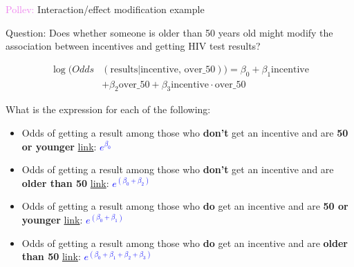 \documentclass[10pt,t]{beamer}
\begin{document}
\begin{frame}{\textcolor{violet}{Pollev:} Interaction/effect modification example}
	
	\vspace{-5 mm}
	
	Question: Does whether someone is older than 50 years old might modify the association between incentives and getting HIV test results?
	
	
	\vspace{-3 mm}
	
	\color{blue}
	\begin{align*}
	\log(Odds&(\text{results}|\text{incentive, over\_50})) = \beta_0 + \beta_1\text{incentive}\\&+\beta_2\text{over\_50}+\beta_3\text{incentive}\cdot\text{over\_50}
	\end{align*}
	\color{black}
	
	\vspace{-2 mm}
	
	What is the expression for each of the following:
	
	\medskip
	
	\begin{itemize}
		\item Odds of getting a result among those who \textbf{don't} get an incentive and are \textbf{50 or younger}  \textcolor{purple}{\href{https://PollEv.com/multiple_choice_polls/1LE88Rsf2hnEYB0ktPIbl/respond}{link}}: \pause  \textcolor{blue}{$e^{\beta_0}$}
		
		\medskip
		
		\item Odds of getting a result among those who \textbf{don't} get an incentive and are \textbf{older than 50}  \textcolor{purple}{\href{https://PollEv.com/multiple_choice_polls/hSAtrOO3BuKbqy5zdGwch/respond}{link}}: \pause  \textcolor{blue}{$e^{(\beta_0+\beta_2)}$}
		
		\medskip
		
		\item Odds of getting a result among those who \textbf{do} get an incentive and are \textbf{50 or younger}  \textcolor{purple}{\href{https://PollEv.com/multiple_choice_polls/E513SDYKPbxFENUWdq6Ly/respond}{link}}: \pause  \textcolor{blue}{$e^{(\beta_0+\beta_1)}$}
		
		\medskip
		
		\item Odds of getting a result among those who \textbf{do} get an incentive and are \textbf{older than 50} \textcolor{purple}{\href{https://PollEv.com/multiple_choice_polls/1L1S08HSw3G4P1isemgIt/respond}{link}}: \pause  \textcolor{blue}{$e^{(\beta_0+\beta_1 + \beta_2 +\beta_3)}$}
		
		
		
	\end{itemize}
	
\end{frame}
\end{document}

